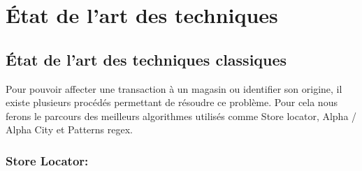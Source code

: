 \chapter{État de l'art des techniques}
\minitoc
\newpage
 
\section{État de l'art des techniques classiques}
Pour pouvoir affecter une transaction à un magasin ou identifier son origine, il existe plusieurs procédés permettant de résoudre ce problème. Pour cela nous ferons le parcours des meilleurs algorithmes utilisés comme Store locator, Alpha / Alpha City et Patterns regex.

\subsection{Store Locator:}

